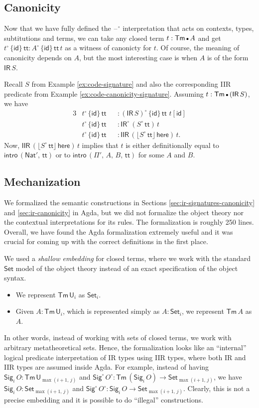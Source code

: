 \documentclass[acmsmall,screen,review,anonymous]{acmart}
\newcommand{\msf}[1]{{\mathsf{#1}}}
\newcommand{\U}{\msf{U}}
\newcommand{\Set}{\msf{Set}}
\newcommand{\Nat}{\msf{Nat}}
\newcommand{\Sig}{\msf{Sig}}
\newcommand{\ttt}{\msf{tt}}
\newcommand{\blank}{{\mathord{\hspace{1pt}\text{--}\hspace{1pt}}}}
\newcommand{\IR}{\msf{IR}}
\newcommand{\intro}{\msf{intro}}
\newcommand{\IIR}{\msf{IIR}}
\newcommand{\floord}[1]{\lfloor #1 \rfloor}
\newcommand{\emptycon}{\scaleobj{.75}\bullet}
\newcommand{\id}{\msf{id}}
\newcommand{\Tm}{\msf{Tm}}
\newcommand{\w}{\circ}
\newcommand{\here}{\msf{here}}
\begin{document}
\subsection{Canonicity}

Now that we have fully defined the $\blank^\w$ interpretation that acts on contexts, types,
subtitutions and terms, we can take any closed term $t : \Tm\,\emptycon\,A$ and get
$t^\w\,\{\id\}\,\ttt : A^\w\,\{\id\}\,\ttt\,t$ as a witness of canonicty for $t$. Of course, the
meaning of canonicity depends on $A$, but the most interesting case is when $A$ is of the form
$\IR\,S$.
\begin{example}
Recall $S$ from Example \ref{ex:code-signature} and
also the corresponding IIR predicate from Example \ref{ex:code-canonicity-signature}. Assuming $t :
\Tm\,\emptycon\,(\IR\,S)$, we have
\begin{alignat*}{3}
  &t^\w\,\{\id\}\,\ttt &&: (\IR\,S)^\w\,\{\id\}\,\ttt\,\,t[\id]\\
  &t^\w\,\{\id\}\,\ttt &&: \IR^\w\,(S^\w\,\ttt)\,t\\
  &t^\w\,\{\id\}\,\ttt &&: \IIR\,(\floord{S^\w\,\ttt}\,\here)\,t.
\end{alignat*}
Now, $\IIR\,(\floord{S^\w\,\ttt}\,\here)\,t$ implies that $t$ is either definitionally equal to $\intro\,(\Nat',\,\ttt)$
or to $\intro\,(\Pi',\,A,\,B,\,\ttt)$ for some $A$ and $B$.
\end{example}

\subsection{Mechanization}

We formalized the semantic constructions in Sections \ref{sec:ir-signatures-canonicity} and
\ref{sec:ir-canonicity} in Agda, but we did not formalize the object theory nor the contextual
interpretations for its rules. The formalization is roughly 250 lines. Overall, we have found the
Agda formalization extremely useful and it was crucial for coming up with the correct definitions in
the first place.

We used a \emph{shallow embedding} for closed terms, where we work with the standard $\Set$ model of
the object theory instead of an exact specification of the object syntax.
\begin{itemize}
\item We represent $\Tm\,\U_i$ as $\Set_i$.
\item Given $A : \Tm\,\U_i$, which is represented simply as $A : \Set_i$, we represent $\Tm\,A$ as $A$.
\end{itemize}
In other words, instead of working with sets of closed terms, we work with arbitrary metatheoretical
sets. Hence, the formalization looks like an ``internal'' logical predicate interpretation of IR
types using IIR types, where both IR and IIR types are assumed inside Agda. For example, instead of
having $\Sig_i\,O : \Tm\,\U_{\max(i+1,\,j)}$ and $\Sig^\w\,O^\w : \Tm\,(\Sig_i\,O) \to
\Set_{\max(i+1,\,j)}$, we have $\Sig_i\,O : \Set_{\max(i+1,\,j)}$ and $\Sig^\w\,O^\w : \Sig_i\,O \to
\Set_{\max(i+1,\,j)}$. Clearly, this is not a precise embedding and it is possible to do ``illegal''
constructions.
\end{document}
